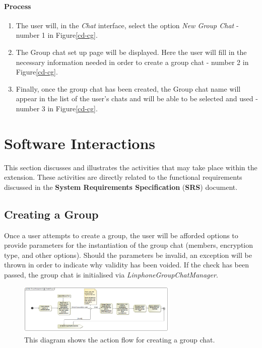 \documentclass[11pt]{article}
\begin{document}
\paragraph{Process}
\begin{enumerate}
\item The user will, in the \textit{Chat} interface, select the option \textit{New Group Chat} - number 1 in Figure\ref{cd-cg}.
\item The Group chat set up page will be displayed. Here the user will fill in the necessary information needed in order to create a group chat - number 2 in Figure\ref{cd-cg}.
\item Finally, once the group chat has been created, the Group chat name will appear in the list of the user's chats and will be able to be selected and used - number 3 in Figure\ref{cd-cg}.
\end{enumerate}




\section{Software Interactions}
This section discusses and illustrates the activities that may take place within the extension. These activities are directly related to the functional requirements discussed in the \textbf{System Requirements Specification} (\textbf{SRS}) document.
\subsection{Creating a Group}
Once a user attempts to create a group, the user will be afforded options to provide parameters for the instantiation of the group chat (members, encryption type, and other options). Should the parameters be invalid, an exception will be thrown in order to indicate why validity has been voided. If the check has been passed, the group chat is initialised via \textit{LinphoneGroupChatManager}.
\begin{figure}[H]
\centering
\includegraphics[width=3in]{./images/activity_create_group.png}
\caption[Create Group Activity Diagram]{This diagram shows the action flow for creating a group chat.}
\label{ad-create-group}
\end{figure}
\end{document}
